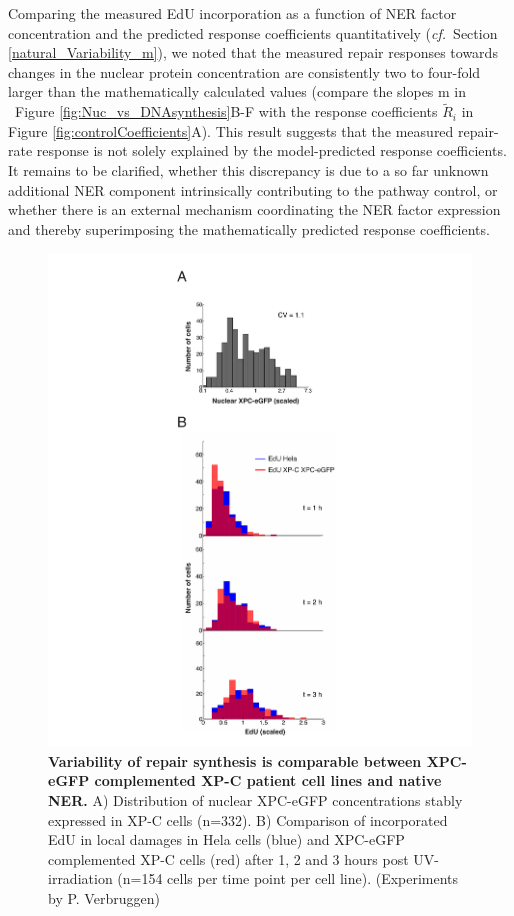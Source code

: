 Comparing the measured EdU incorporation as a function of NER factor concentration and the predicted response coefficients quantitatively (\textit{cf.}\ Section \ref{natural_Variability_m}), we noted that the measured repair responses towards changes in the nuclear protein concentration are consistently two to four-fold larger than the mathematically calculated values (compare the slopes m in \ Figure \ref{fig:Nuc_vs_DNAsynthesis}B-F with the response coefficients $\tilde{R}_i$ in Figure \ref{fig:controlCoefficients}A). This result suggests that the measured repair-rate response is not solely explained by the model-predicted response coefficients. It remains to be clarified, whether this discrepancy is due to a so far unknown additional NER component intrinsically contributing to the pathway control, or whether there is an external mechanism coordinating the NER factor expression and thereby superimposing the mathematically predicted response coefficients.

\begin{figure}[htbp]
	\begin{center}
		\includegraphics[width=1\textwidth]{Abbildungen/figure3_4.pdf}
		\caption{\textbf{Variability of repair synthesis is comparable between XPC-eGFP complemented XP-C patient cell lines and native NER.} A) Distribution of nuclear XPC-eGFP concentrations stably expressed in XP-C cells (n=332). B) Comparison of incorporated EdU in local damages in Hela cells (blue) and XPC-eGFP complemented XP-C cells (red) after 1, 2 and 3 hours post UV-irradiation (n=154 cells per time point per cell line). (Experiments by P. Verbruggen)}
		\label{fig:consistVariability}
	\end{center}
\end{figure}

